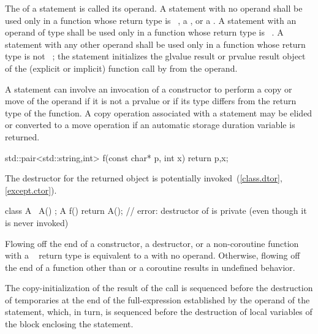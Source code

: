 \pnum
The 
of a  statement is called its operand. A  statement with
no operand shall be used only in a function whose return type is
\cv{}~, a , or a
.
%
%
A  statement with an operand of type  shall be used only
in a function whose return type is \cv{}~.
A  statement with any other operand shall be used only
in a function whose return type is not \cv{}~;
%
the  statement initializes the
glvalue result or prvalue result object of the (explicit or implicit) function call
by  from the operand.
\begin{note}
A  statement can involve
an invocation of a constructor to perform a copy or move of the operand
if it is not a prvalue or if its type differs from the return type of the function.
A copy operation associated with a  statement may be elided or
converted to a move operation if an automatic storage duration variable is returned.
\end{note}
\begin{example}
\begin{codeblock}
std::pair<std::string,int> f(const char* p, int x) {
  return {p,x};
}
\end{codeblock}
\end{example}
The destructor for the returned object
is potentially invoked~(\ref{class.dtor}, \ref{except.ctor}).
\begin{example}
\begin{codeblock}
class A {
  ~A() {}
};
A f() { return A(); }   // error: destructor of  is private (even though it is never invoked)
\end{codeblock}
\end{example}
Flowing off the end of
a constructor,
a destructor, or
a non-coroutine function with a \cv{}~ return type is
equivalent to a  with no operand.
Otherwise, flowing off the end of a function
other than  or a coroutine
results in undefined behavior.

\pnum
The copy-initialization of the result of the call is sequenced before the
destruction of temporaries at the end of the full-expression established
by the operand of the  statement, which, in turn, is sequenced
before the destruction of local variables of the block
enclosing the  statement.

